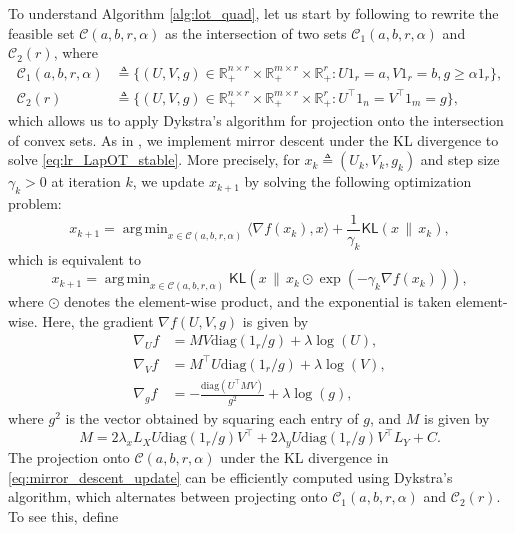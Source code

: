 \documentclass{article}
\theoremstyle{definition}
\newcommand{\cC}{\mathcal{C}}
\newcommand{\R}{\mathbb{R}}
\DeclareMathOperator*{\argmin}{arg\,min}
\begin{document}
To understand Algorithm \ref{alg:lot_quad}, let us start by following \cite{scetbon2021low} to rewrite the feasible set $\cC(a, b, r, \alpha)$ as the intersection of two sets $\cC_1(a, b, r, \alpha)$ and $\cC_2(r)$, where 
\begin{align*}
    \cC_1(a, b, r, \alpha) & \triangleq \{(U, V, g) \in \R_+^{n \times r} \times \R_+^{m \times r} \times \R_+^r : U 1_r = a, V 1_r = b, g \ge \alpha 1_r\}, \\
    \cC_2(r) & \triangleq \{(U, V, g) \in \R_+^{n \times r} \times \R_+^{m \times r} \times \R_+^r : U^\top 1_n = V^\top 1_m = g\},
\end{align*}
which allows us to apply Dykstra's algorithm for projection onto the intersection of convex sets. As in \cite{scetbon2021low}, we implement mirror descent under the KL divergence to solve \eqref{eq:lr_LapOT_stable}. More precisely, for $x_k \triangleq (U_k, V_k, g_k)$ and step size $\gamma_k > 0$ at iteration $k$, we update $x_{k + 1}$ by solving the following optimization problem:
\begin{equation*}
    x_{k + 1} = \argmin_{x \in \cC(a, b, r, \alpha)} \langle \nabla f(x_k), x \rangle + \frac{1}{\gamma_k} \mathsf{KL}(x \, \| \, x_k),
\end{equation*}
which is equivalent to 
\begin{equation}
    \label{eq:mirror_descent_update}
    x_{k + 1} = \argmin_{x \in \cC(a, b, r, \alpha)} \mathsf{KL}\left(x \, \| \, x_k \odot \exp(-\gamma_k \nabla f(x_k))\right),
\end{equation}
where $\odot$ denotes the element-wise product, and the exponential is taken element-wise. Here, the gradient $\nabla f(U, V, g)$ is given by
\begin{align*}
    \nabla_U f & = M V \mathrm{diag}(1_r / g) + \lambda \log(U), \\
    \nabla_V f & = M^\top U \mathrm{diag}(1_r / g) + \lambda \log(V ), \\
    \nabla_g f & = -\frac{\mathrm{diag}(U^\top M V)}{g^2} + \lambda \log(g),
\end{align*}
where $g^2$ is the vector obtained by squaring each entry of $g$, and $M$ is given by
\begin{equation*}
    M = 2 \lambda_x L_X U \mathrm{diag}(1_r / g) V^\top + 2 \lambda_y U \mathrm{diag}(1_r / g) V^\top L_Y + C.
\end{equation*}
The projection onto $\cC(a, b, r, \alpha)$ under the KL divergence in \eqref{eq:mirror_descent_update} can be efficiently computed using Dykstra's algorithm, which alternates between projecting onto $\cC_1(a, b, r, \alpha)$ and $\cC_2(r)$. To see this, define
\end{document}
